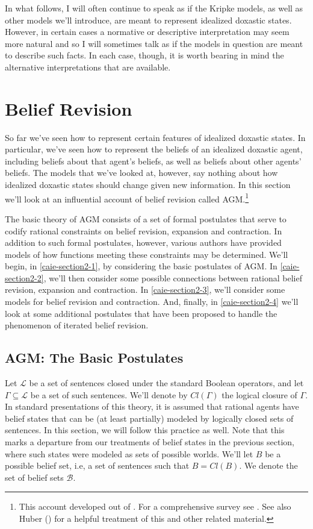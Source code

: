 In what follows, I will often continue to speak as if the Kripke models, as well as other models we'll introduce, are meant to represent idealized doxastic states.
However, in certain cases a normative or descriptive interpretation may seem more natural and so I will sometimes talk as if the models in question are meant to describe such facts.
In each case, though, it is worth bearing in mind the alternative interpretations that are available.




\section{Belief Revision}\label{caie-section2}

So far we've seen how to represent certain features of idealized doxastic states. 
In particular, we've seen how to represent the beliefs of an idealized doxastic agent, including beliefs about that agent's beliefs, as well as beliefs about other agents' beliefs. 
The models that we've looked at, however, say nothing about how idealized doxastic states should change given new information.
In this section we'll look at an influential account of belief revision called AGM.\footnote{This account developed out of \citet{AGM}. For a comprehensive survey see \citet{Gardenfors1}. See also Huber () for a helpful treatment of this and other related material.}

The basic theory of AGM consists of a set of formal postulates that serve to codify rational constraints on belief revision, expansion and contraction.
In addition to such formal postulates, however, various authors have provided models of how functions meeting these constraints may be determined.
We'll begin, in \autoref{caie-section2-1}, by considering the basic postulates of AGM.
In \autoref{caie-section2-2}, we'll then consider some possible connections between rational belief revision, expansion and contraction.
In \autoref{caie-section2-3}, we'll consider some models for belief revision and contraction.
And, finally, in \autoref{caie-section2-4} we'll look at some additional postulates that have been proposed to handle the phenomenon of iterated belief revision. 


\subsection{AGM: The Basic Postulates}\label{caie-section2-1}


Let $\mathcal{L}$ be a set of sentences closed under the standard Boolean operators, and let $\Gamma \subseteq \mathcal{L}$ be a set of such sentences. 
We'll denote by $Cl(\Gamma)$ the logical closure of $\Gamma$.
In standard presentations of this theory, it is assumed that rational agents have belief states that can be (at least partially) modeled by logically closed sets of sentences.
In this section, we will follow this practice as well.
Note that this marks a departure from our treatments of belief states in the previous section, where such states were modeled as sets of possible worlds.
We'll let $B$ be a possible belief set, i.e, a set of sentences such that $B = Cl(B)$.
We denote the set of belief sets $\mathcal{B}$.

